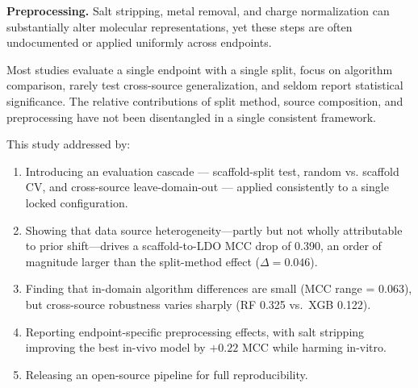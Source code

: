 \textbf{Preprocessing.} Salt stripping, metal removal, and charge normalization can substantially alter molecular representations,\cite{Fourches_2010,Fourches_2016} 
yet these steps are often undocumented or applied uniformly across endpoints.

Most studies evaluate a single endpoint with a single split, focus on algorithm comparison,\cite{Yang_2019,Mayr_2016} rarely test cross-source generalization, 
and seldom report statistical significance.\cite{Demsar_2006} The relative contributions of split method, source composition, and preprocessing have not been disentangled in a single consistent framework.

This study addressed by:
\begin{enumerate}
    \item Introducing an evaluation cascade — scaffold-split test, random vs. scaffold CV, and cross-source leave-domain-out — applied consistently to a single locked configuration.
    
    \item Showing that data source heterogeneity---partly but not wholly attributable to prior shift---drives a scaffold-to-LDO MCC drop of 0.390, an order of magnitude larger than the split-method effect ($\Delta = 0.046$).
    
    \item Finding that in-domain algorithm differences are small (MCC range = 0.063), but cross-source robustness varies sharply (RF 0.325 vs.\ XGB 0.122).
    
    \item Reporting endpoint-specific preprocessing effects, with salt stripping improving the best in-vivo model by $+0.22$ MCC while harming in-vitro.
    
    \item Releasing an open-source pipeline for full reproducibility.
\end{enumerate}